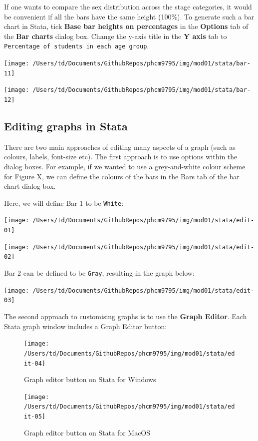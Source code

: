 \documentclass[
]{memoir}
\begin{document}
If one wants to compare the sex distribution across the stage categories, it would be convenient if all the bars have the same height (100\%). To generate such a bar chart in Stata, tick \textbf{Base bar heights on percentages} in the \textbf{Options} tab of the \textbf{Bar charts} dialog box. Change the y-axis title in the \textbf{Y axis} tab to \texttt{Percentage\ of\ students\ in\ each\ age\ group}.

\texttt{[image: /Users/td/Documents/GithubRepos/phcm9795/img/mod01/stata/bar-11]}

\texttt{[image: /Users/td/Documents/GithubRepos/phcm9795/img/mod01/stata/bar-12]}

\hypertarget{editing-graphs-in-stata}{%
\subsection{Editing graphs in Stata}\label{editing-graphs-in-stata}}

There are two main approaches of editing many aspects of a graph (such as colours, labels, font-size etc). The first approach is to use options within the dialog boxes. For example, if we wanted to use a grey-and-white colour scheme for Figure X, we can define the colours of the bars in the Bars tab of the bar chart dialog box.

Here, we will define Bar 1 to be \texttt{White}:

\texttt{[image: /Users/td/Documents/GithubRepos/phcm9795/img/mod01/stata/edit-01]}

\texttt{[image: /Users/td/Documents/GithubRepos/phcm9795/img/mod01/stata/edit-02]}

Bar 2 can be defined to be \texttt{Gray}, resulting in the graph below:

\texttt{[image: /Users/td/Documents/GithubRepos/phcm9795/img/mod01/stata/edit-03]}

The second approach to customising graphs is to use the \textbf{Graph Editor}. Each Stata graph window includes a Graph Editor button:

\begin{figure}[H]
\texttt{[image: /Users/td/Documents/GithubRepos/phcm9795/img/mod01/stata/edit-04]} \caption{Graph editor button on Stata for Windows}\label{fig:unnamed-chunk-44}
\end{figure}

\begin{figure}[H]
\texttt{[image: /Users/td/Documents/GithubRepos/phcm9795/img/mod01/stata/edit-05]} \caption{Graph editor button on Stata for MacOS}\label{fig:unnamed-chunk-45}
\end{figure}
\end{document}
